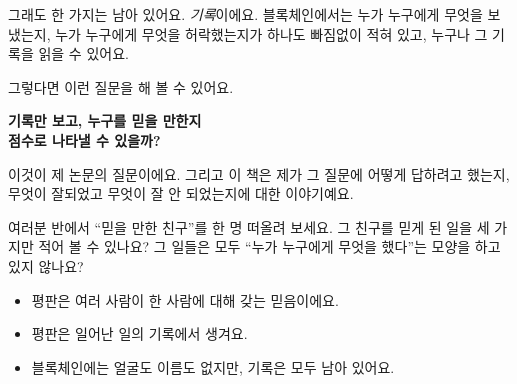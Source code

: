 그래도 한 가지는 남아 있어요.
\emph{기록}이에요.
블록체인에서는 누가 누구에게 무엇을 보냈는지, 누가 누구에게 무엇을 허락했는지가
하나도 빠짐없이 적혀 있고, 누구나 그 기록을 읽을 수 있어요.

그렇다면 이런 질문을 해 볼 수 있어요.

\begin{center}
\begin{tcolorbox}[colback=white, colframe=inkblue, boxrule=0.8pt, arc=2mm, width=0.9\linewidth, halign=center]
\titlefont\bfseries 기록만 보고, 누구를 믿을 만한지\\점수로 나타낼 수 있을까?
\end{tcolorbox}
\end{center}

이것이 제 논문의 질문이에요.
그리고 이 책은 제가 그 질문에 어떻게 답하려고 했는지,
무엇이 잘되었고 무엇이 잘 안 되었는지에 대한 이야기예요.

\begin{think}
여러분 반에서 “믿을 만한 친구”를 한 명 떠올려 보세요.
그 친구를 믿게 된 일을 세 가지만 적어 볼 수 있나요?
그 일들은 모두 “누가 누구에게 무엇을 했다”는 모양을 하고 있지 않나요?
\end{think}

\begin{learned}
\begin{itemize}
\item 평판은 여러 사람이 한 사람에 대해 갖는 믿음이에요.
\item 평판은 일어난 일의 기록에서 생겨요.
\item 블록체인에는 얼굴도 이름도 없지만, 기록은 모두 남아 있어요.
\end{itemize}
\end{learned}
